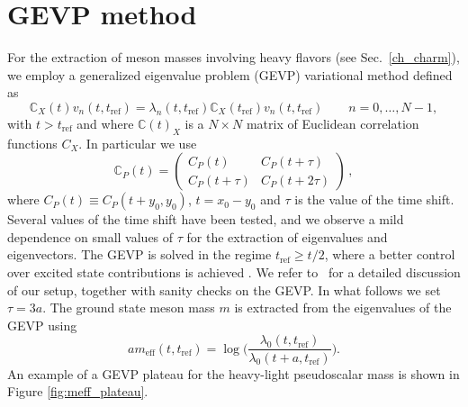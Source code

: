 \chapter{GEVP method}
\label{apex_GEVP}

For the extraction of meson masses involving heavy flavors (see Sec.~\ref{ch_charm}), we employ a generalized eigenvalue problem (GEVP) variational method defined as 
\begin{equation}\label{eq:gevp_sec3}
 	\mathit{\mathbb{C}}_X(t) v_n(t,t_{\mathrm{ref}}) = \lambda_n(t,t_{\mathrm{ref}}) \mathit{\mathbb{C}}_X(t_{\mathrm{ref}})v_n(t,t_{\mathrm{ref}}) \qquad n=0,\ldots,N-1 ,
\end{equation}
with $t>t_{\mathrm{ref}}$ and where $\mathit{\mathbb{C}}(t)_X$ is a $N\times N$ matrix of Euclidean correlation functions $C_X$. In particular we use
\begin{equation}
 	\mathit{\mathbb{C}}_{P}(t) = \left(\begin{matrix}
 		C_{P}(t)  &  C_{P}(t+\tau)
 		\\
 		C_{P}(t+\tau)  & C_{P}(t+2\tau)
 	\end{matrix}\right) \,,
\label{eq:gevp_matrix}
\end{equation}
where $C_P(t)\equiv C_P(t+y_0,y_0)$, $t=x_0-y_0$ and $\tau$ is the value of the time shift. Several values of the time shift have been tested, and we observe a mild dependence on small values of $\tau$ for the extraction of eigenvalues and eigenvectors. The GEVP  is solved in the regime  $t_{\mathrm{ref}} \geq t/2$, where a better control over excited state contributions is achieved \cite{Blossier:2009kd}. We refer to~\citep{charm} for a detailed discussion of our setup, together with sanity checks on the GEVP. In what follows we set $\tau=3a$. The ground state meson mass $m$ is extracted from the eigenvalues of the GEVP using 
\begin{equation}\label{eq:eff_en_gevp}
	am_{\mathrm{eff}}(t,t_{\mathrm{ref}})=\log\bigg(\frac{\lambda_0(t,t_{\mathrm{ref}})}{\lambda_0(t+a,t_{\mathrm{ref}})}\bigg).
\end{equation}
An example of a GEVP plateau for the heavy-light pseudoscalar mass is shown in Figure \ref{fig:meff_plateau}. 
 
